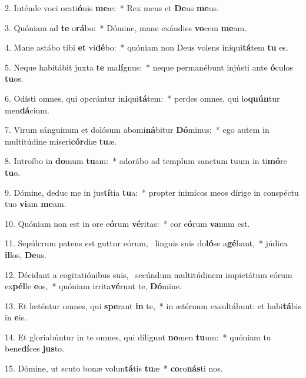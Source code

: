 2. Inténde voci orati\textbf{ó}nis \textbf{me}æ:~*  Rex meus et \textbf{De}us \textbf{me}us.\

3. Quóniam ad \textbf{te} o\textbf{rá}bo:~*  Dómine, mane exáudies \textbf{vo}cem \textbf{me}am.\

4. Mane astábo tibi \textbf{et} vi\textbf{dé}bo:~*  quóniam non Deus volens iniqui\textbf{tá}tem \textbf{tu} es.\

5. Neque habitábit juxta \textbf{te} ma\textbf{lí}gnus:~*  neque permanébunt injústi ante \textbf{ó}culos \textbf{tu}os.\

6. Odísti omnes, qui operántur in\textbf{i}qui\textbf{tá}tem:~*  perdes omnes, qui lo\textbf{quún}tur men\textbf{dá}cium.\

7. Virum sánguinum et dolósum abomi\textbf{ná}bitur \textbf{Dó}minus:~*  ego autem in multitúdine miseri\textbf{cór}diæ \textbf{tu}æ.\

8. Introíbo in \textbf{do}mum \textbf{tu}am:~*  adorábo ad templum sanctum tuum in ti\textbf{mó}re \textbf{tu}o.\

9. Dómine, deduc me in jus\textbf{tí}tia \textbf{tu}a:~*  propter inimícos meos dírige in conspéctu tuo \textbf{vi}am \textbf{me}am.\

10. Quóniam non est in ore e\textbf{ó}rum \textbf{vé}ritas:~*  cor e\textbf{ó}rum \textbf{va}num est.\

11. Sepúlcrum patens est guttur eórum, \dag\  linguis suis do\textbf{ló}se a\textbf{gé}bant,~*  júdica \textbf{il}los, \textbf{De}us.\

12. Décidant a cogitatiónibus suis, \dag\  secúndum multitúdinem impietátum eórum ex\textbf{pél}le \textbf{e}os,~*  quóniam irrita\textbf{vé}runt te, \textbf{Dó}mine.\

13. Et læténtur omnes, qui \textbf{spe}rant \textbf{in} te,~*  in ætérnum exsultábunt: et habi\textbf{tá}bis in \textbf{e}is.\

14. Et gloriabúntur in te omnes, qui díligunt \textbf{no}men \textbf{tu}um:~*  quóniam tu bene\textbf{dí}ces \textbf{jus}to.\

15. Dómine, ut scuto bonæ volun\textbf{tá}tis \textbf{tu}æ~*  \textbf{co}ro\textbf{nás}ti nos.\


